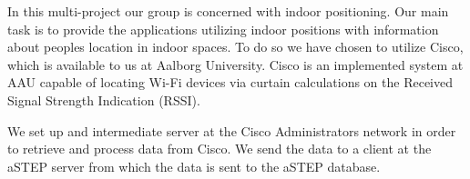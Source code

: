 

In this multi-project our group is concerned with indoor positioning. Our main task is to provide the applications utilizing indoor positions with information about peoples location in indoor spaces. To do so we have chosen to utilize Cisco, which is available to us at Aalborg University. Cisco is an implemented system at AAU capable of locating Wi-Fi devices via curtain calculations on the Received Signal Strength Indication (RSSI).

We set up and intermediate server at the Cisco Administrators network in order to retrieve and process data from Cisco. We send the data to a client at the aSTEP server from which the data is sent to the aSTEP database.